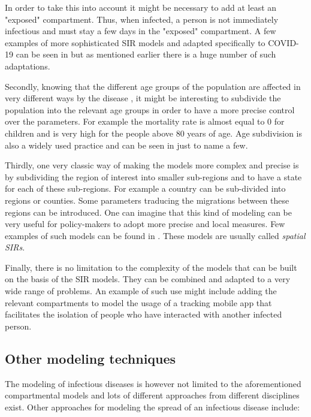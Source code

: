 \documentclass[12pt, letterpaper]{article}
\begin{document}
In order to take this into account it might be necessary to add at least an "exposed" compartment. 
Thus, when infected, a person is not immediately infectious and must stay a few days in the "exposed" compartment. 
A few examples of more sophisticated SIR models and adapted specifically to COVID-19 can be seen in \cite{seir} but as mentioned earlier there is a huge number of such adaptations.


Secondly, knowing that the different age groups of the population are affected in very different ways by the disease \cite{agegroups}, it might be interesting to subdivide the population into the relevant age groups in order to have a more precise control over the parameters. 
For example the mortality rate is almost equal to 0 for children and is very high for the people above 80 years of age. 
Age subdivision is also a widely used practice and can be seen in \cite{age} just to name a few.

Thirdly, one very classic way of making the models more complex and precise is by subdividing the region of interest into smaller sub-regions and to have a state for each of these sub-regions. 
For example a country can be sub-divided into regions or counties. 
Some parameters traducing the migrations between these regions can be introduced. 
One can imagine that this kind of modeling can be very useful for policy-makers to adopt more precise and local measures. 
Few examples of such models can be found in \cite{spatial}. 
These models are usually called {\em spatial SIRs}. 

Finally, there is no limitation to the complexity of the models that can be built on the basis of the SIR models. 
They can be combined and adapted to a very wide range of problems. 
An example of such use might include adding the relevant compartments to model the usage of a tracking mobile app that facilitates the isolation of people who have interacted with another infected person.

\subsection{Other modeling techniques}

The modeling of infectious diseases is however not limited to the aforementioned compartmental models and lots of different approaches from different disciplines exist. 
Other approaches for modeling the spread of an infectious disease include:
\end{document}
